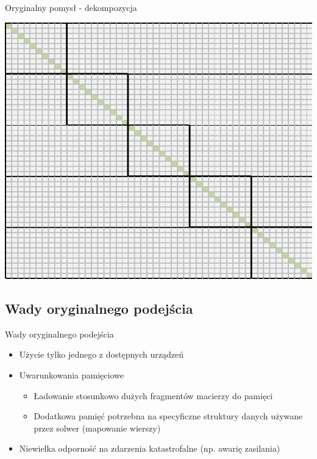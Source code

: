 \documentclass[12pt]{beamer}
\begin{document}
\begin{frame}{Oryginalny pomysł - dekompozycja}
\begin{center}
	\includegraphics[scale=0.4]{dekompozycja}
\end{center}
\end{frame}

\subsection{Wady oryginalnego podejścia}
\begin{frame}{Wady oryginalnego podejścia}
\begin{itemize}
	\item Użycie tylko jednego z dostępnych urządzeń
	\item Uwarunkowania pamięciowe
	\begin{itemize}
	    \item Ładowanie stosunkowo dużych fragmentów macierzy do pamięci
	    \item Dodatkowa pamięć potrzebna na specyficzne struktury danych używane przez solwer (mapowanie wierszy)
	\end{itemize}
	\item Niewielka odporność na zdarzenia katastrofalne (np. awarię zasilania)
	
\end{itemize}
\end{frame}
\end{document}

